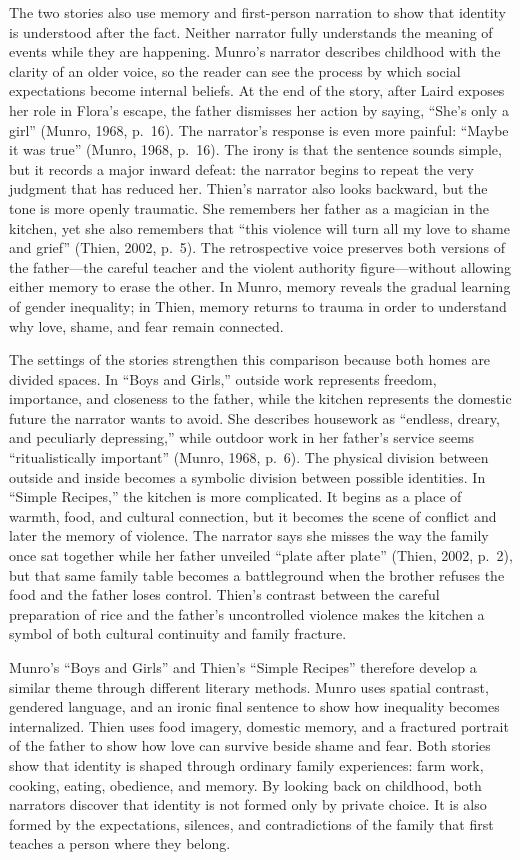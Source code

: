 \documentclass[12pt]{article}
\begin{document}
The two stories also use memory and first-person narration to show that identity is understood after the fact. Neither narrator fully understands the meaning of events while they are happening. Munro's narrator describes childhood with the clarity of an older voice, so the reader can see the process by which social expectations become internal beliefs. At the end of the story, after Laird exposes her role in Flora's escape, the father dismisses her action by saying, ``She's only a girl'' (Munro, 1968, p.~16). The narrator's response is even more painful: ``Maybe it was true'' (Munro, 1968, p.~16). The irony is that the sentence sounds simple, but it records a major inward defeat: the narrator begins to repeat the very judgment that has reduced her. Thien's narrator also looks backward, but the tone is more openly traumatic. She remembers her father as a magician in the kitchen, yet she also remembers that ``this violence will turn all my love to shame and grief'' (Thien, 2002, p.~5). The retrospective voice preserves both versions of the father---the careful teacher and the violent authority figure---without allowing either memory to erase the other. In Munro, memory reveals the gradual learning of gender inequality; in Thien, memory returns to trauma in order to understand why love, shame, and fear remain connected.

The settings of the stories strengthen this comparison because both homes are divided spaces. In ``Boys and Girls,'' outside work represents freedom, importance, and closeness to the father, while the kitchen represents the domestic future the narrator wants to avoid. She describes housework as ``endless, dreary, and peculiarly depressing,'' while outdoor work in her father's service seems ``ritualistically important'' (Munro, 1968, p.~6). The physical division between outside and inside becomes a symbolic division between possible identities. In ``Simple Recipes,'' the kitchen is more complicated. It begins as a place of warmth, food, and cultural connection, but it becomes the scene of conflict and later the memory of violence. The narrator says she misses the way the family once sat together while her father unveiled ``plate after plate'' (Thien, 2002, p.~2), but that same family table becomes a battleground when the brother refuses the food and the father loses control. Thien's contrast between the careful preparation of rice and the father's uncontrolled violence makes the kitchen a symbol of both cultural continuity and family fracture.

Munro's ``Boys and Girls'' and Thien's ``Simple Recipes'' therefore develop a similar theme through different literary methods. Munro uses spatial contrast, gendered language, and an ironic final sentence to show how inequality becomes internalized. Thien uses food imagery, domestic memory, and a fractured portrait of the father to show how love can survive beside shame and fear. Both stories show that identity is shaped through ordinary family experiences: farm work, cooking, eating, obedience, and memory. By looking back on childhood, both narrators discover that identity is not formed only by private choice. It is also formed by the expectations, silences, and contradictions of the family that first teaches a person where they belong.
\end{document}

